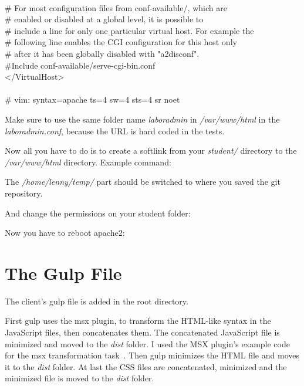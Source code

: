 {	\\
	\# For most configuration files from conf-available/, which are\\
	\# enabled or disabled at a global level, it is possible to\\
	\# include a line for only one particular virtual host. For example the\\
	\# following line enables the CGI configuration for this host only\\
	\# after it has been globally disabled with "a2disconf".\\
	\#Include conf-available/serve-cgi-bin.conf\\
	</VirtualHost>\\
	\\
	\# vim: syntax=apache ts=4 sw=4 sts=4 sr noet
	}

Make sure to use the same folder name \emph{laboradmin} in \emph{/var/www/html} in the \emph{laboradmin.conf}, because the URL is hard coded in the tests.

Now all you have to do is to create a softlink from your\emph{ student/} directory to the \emph{/var/www/html} directory. Example command:

	
The \emph{/home/lenny/temp/} part should be switched to where you saved the git repository.

And change the permissions on your student folder:


Now you have to reboot apache2:


\section{The Gulp File}\label{gulp-file}
The client's gulp file is added in the root directory. 

First gulp uses the msx plugin, to transform the HTML-like syntax in the JavaScript files, then concatenates them. The concatenated JavaScript file is minimized and moved to the \emph{dist} folder. I used the MSX plugin's example code for the msx transformation task~\cite{gulp-msx-example}. Then gulp minimizes the HTML file and moves it to the \emph{dist} folder. At last the CSS files are concatenated, minimized and the minimized file is moved to the \emph{dist} folder. 

